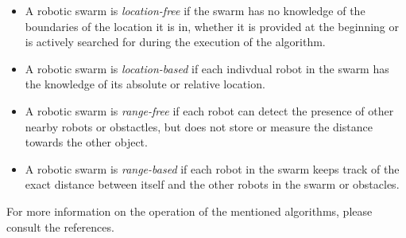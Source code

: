   \begin{itemize}
    \item A robotic swarm is \emph{location-free} if the swarm has no knowledge of the boundaries of the location it is in, whether it is provided at the beginning or is actively searched for during the execution of the algorithm. 
    \item A robotic swarm is \emph{location-based} if each indivdual robot in the swarm has the knowledge of its absolute or relative location.
    \item A robotic swarm is \emph{range-free} if each robot can detect the presence of other nearby robots or obstactles, but does not store or measure the distance towards the other object.
    \item A robotic swarm is \emph{range-based} if each robot in the swarm keeps track of the exact distance between itself and the other robots in the swarm or obstacles. 
  \end{itemize}
For more information on the operation of the mentioned algorithms, please consult the references. 

